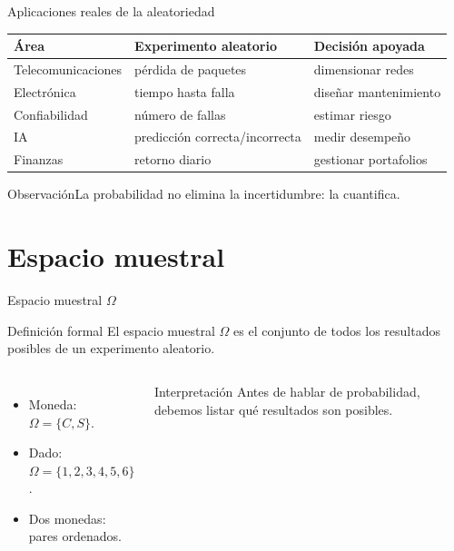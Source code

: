 \documentclass[aspectratio=169,11pt]{beamer}
\newcommand{\observacion}[1]{\begin{block}{Observación}#1\end{block}}
\begin{document}
\begin{frame}{Aplicaciones reales de la aleatoriedad}
\small
\begin{tabular}{p{}p{}p{}}
\toprule
Área & Experimento aleatorio & Decisión apoyada \\
\midrule
Telecomunicaciones & pérdida de paquetes & dimensionar redes \\
Electrónica & tiempo hasta falla & diseñar mantenimiento \\
Confiabilidad & número de fallas & estimar riesgo \\
IA & predicción correcta/incorrecta & medir desempeño \\
Finanzas & retorno diario & gestionar portafolios \\
\bottomrule
\end{tabular}
\vspace{0.5em}
\observacion{La probabilidad no elimina la incertidumbre: la cuantifica.}
\end{frame}

\section{Espacio muestral}

\begin{frame}{Espacio muestral $\Omega$}
\begin{block}{Definición formal}
El espacio muestral $\Omega$ es el conjunto de todos los resultados posibles de un experimento aleatorio.
\end{block}
\pause
\begin{columns}[T]
\begin{itemize}
  \item Moneda: $\Omega=\{C,S\}$.
  \item Dado: $\Omega=\{1,2,3,4,5,6\}$.
  \item Dos monedas: pares ordenados.
\end{itemize}
\begin{exampleblock}{Interpretación}
Antes de hablar de probabilidad, debemos listar qué resultados son posibles.
\end{exampleblock}
\end{columns}
\end{frame}
\end{document}
